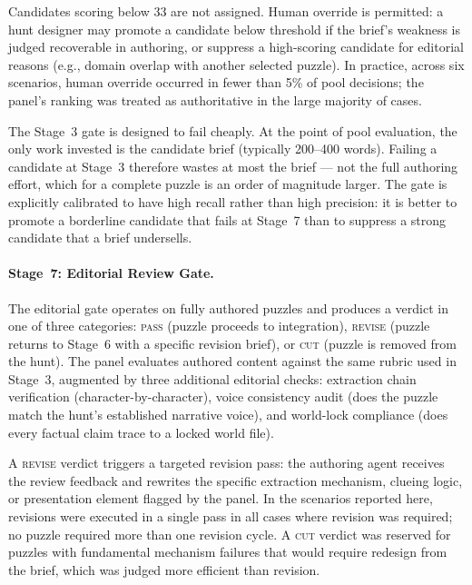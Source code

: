 Candidates scoring below 33 are not assigned. Human override is permitted: a hunt
designer may promote a candidate below threshold if the brief's weakness is judged
recoverable in authoring, or suppress a high-scoring candidate for editorial reasons
(e.g., domain overlap with another selected puzzle). In practice, across six scenarios,
human override occurred in fewer than 5\% of pool decisions; the panel's ranking was
treated as authoritative in the large majority of cases.

The Stage~3 gate is designed to fail cheaply. At the point of pool evaluation, the only
work invested is the candidate brief (typically 200--400 words). Failing a candidate at
Stage~3 therefore wastes at most the brief --- not the full authoring effort, which for a
complete puzzle is an order of magnitude larger. The gate is explicitly calibrated to
have high recall rather than high precision: it is better to promote a borderline candidate
that fails at Stage~7 than to suppress a strong candidate that a brief undersells.

\paragraph{Stage~7: Editorial Review Gate.}

The editorial gate operates on fully authored puzzles and produces a verdict in one of
three categories: \textsc{pass} (puzzle proceeds to integration), \textsc{revise} (puzzle
returns to Stage~6 with a specific revision brief), or \textsc{cut} (puzzle is removed
from the hunt). The panel evaluates authored content against the same rubric used in
Stage~3, augmented by three additional editorial checks: extraction chain verification
(character-by-character), voice consistency audit (does the puzzle match the hunt's
established narrative voice), and world-lock compliance (does every factual claim
trace to a locked world file).

A \textsc{revise} verdict triggers a targeted revision pass: the authoring agent receives
the review feedback and rewrites the specific extraction mechanism, clueing logic, or
presentation element flagged by the panel. In the scenarios reported here, revisions were
executed in a single pass in all cases where revision was required; no puzzle required
more than one revision cycle. A \textsc{cut} verdict was reserved for puzzles with
fundamental mechanism failures that would require redesign from the brief, which was judged
more efficient than revision.

